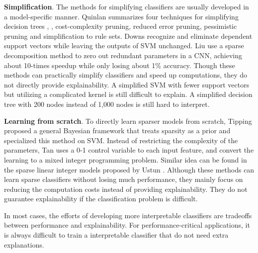 
\textbf{Simplification}. The methods for simplifying classifiers are usually developed in a model-specific manner. Quinlan summarizes four techniques for simplifying decision trees \cite{quinlan1987simplifying}, \ie, cost-complexity pruning, reduced error pruning, pessimistic pruning and simplification to rule sets. Downs \etal \cite{downs2001simplifysvm} recognize and eliminate dependent support vectors while leaving the outputs of SVM unchanged. Liu \etal \cite{liu2015sparsecnn} use a sparse decomposition method to zero out redundant parameters in a CNN, achieving about 10-times speedup while only losing about 1\% accuracy. Though these methods can practically simplify classifiers and speed up computations, they do not directly provide explainability. A simplified SVM with fewer support vectors but utilizing a complicated kernel is still difficult to explain. A simplified decision tree with 200 nodes instead of 1,000 nodes is still hard to interpret.

\textbf{Learning from scratch}. To directly learn sparser models from scratch, Tipping \cite{tipping2001sparse} proposed a general Bayesian framework that treats sparsity as a prior and specialized this method on SVM. Instead of restricting the complexity of the parameters, Tan \etal \cite{tan2010sparsesvm} uses a 0-1 control variable to each input feature, and convert the learning to a mixed integer programming problem. Similar idea can be found in the sparse linear integer models proposed by Ustun \etal \cite{ustun2016supersparse}. Although these methods can learn sparse classifiers without losing much performance, they mainly focus on reducing the computation costs instead of providing explainability. They do not guarantee explainability if the classification problem is difficult.

In most cases, the efforts of developing more interpretable classifiers are tradeoffs between performance and explainability. For performance-critical applications, it is always difficult to train a interpretable classifier that do not need extra explanations.


